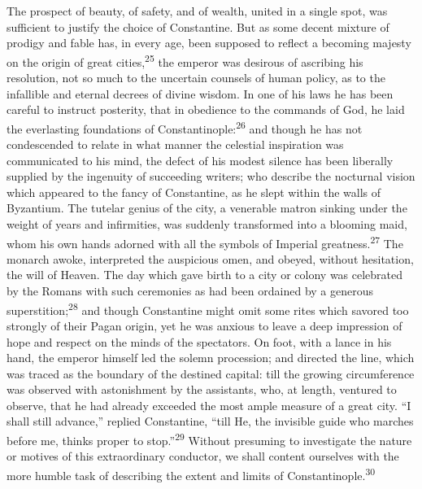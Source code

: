 
The prospect of beauty, of safety, and of wealth, united in a
single spot, was sufficient to justify the choice of Constantine.
But as some decent mixture of prodigy and fable has, in every
age, been supposed to reflect a becoming majesty on the origin of
great cities,\textsuperscript{25} the emperor was desirous of ascribing his
resolution, not so much to the uncertain counsels of human
policy, as to the infallible and eternal decrees of divine
wisdom. In one of his laws he has been careful to instruct
posterity, that in obedience to the commands of God, he laid the
everlasting foundations of Constantinople:\textsuperscript{26} and though he has
not condescended to relate in what manner the celestial
inspiration was communicated to his mind, the defect of his
modest silence has been liberally supplied by the ingenuity of
succeeding writers; who describe the nocturnal vision which
appeared to the fancy of Constantine, as he slept within the
walls of Byzantium. The tutelar genius of the city, a venerable
matron sinking under the weight of years and infirmities, was
suddenly transformed into a blooming maid, whom his own hands
adorned with all the symbols of Imperial greatness.\textsuperscript{27} The
monarch awoke, interpreted the auspicious omen, and obeyed,
without hesitation, the will of Heaven. The day which gave birth
to a city or colony was celebrated by the Romans with such
ceremonies as had been ordained by a generous superstition;\textsuperscript{28}
and though Constantine might omit some rites which savored too
strongly of their Pagan origin, yet he was anxious to leave a
deep impression of hope and respect on the minds of the
spectators. On foot, with a lance in his hand, the emperor
himself led the solemn procession; and directed the line, which
was traced as the boundary of the destined capital: till the
growing circumference was observed with astonishment by the
assistants, who, at length, ventured to observe, that he had
already exceeded the most ample measure of a great city. “I shall
still advance,” replied Constantine, “till He, the invisible
guide who marches before me, thinks proper to stop.”\textsuperscript{29} Without
presuming to investigate the nature or motives of this
extraordinary conductor, we shall content ourselves with the more
humble task of describing the extent and limits of
Constantinople.\textsuperscript{30}

